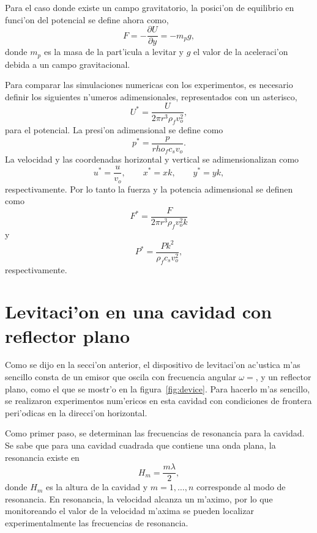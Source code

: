Para el caso donde existe un campo gravitatorio, la posici'on de equilibrio en funci'on del potencial
se define ahora como,
\begin{equation}
F = -\frac{\partial U}{\partial y} = -m_p g,
\end{equation}
donde $m_p$ es la masa de la part'icula a levitar y $g$ el valor de la aceleraci'on debida a un campo gravitacional.

Para comparar las simulaciones numericas con los experimentos, es necesario definir los siguientes n'umeros
adimensionales, representados con un asterisco,
\begin{equation}
U^\ast = \frac{U}{2\pi r^3\rho_fv_o^2},
\end{equation}
para el potencial. La presi'on adimensional se define como
\begin{equation}
p^\ast = \frac{p}{rho_f c_s v_o}.
\end{equation}
La velocidad y las coordenadas horizontal y vertical se adimensionalizan como
\begin{equation}
u^\ast = \frac{u}{v_o},\qquad x^\ast = xk, \qquad y^\ast = yk,
\end{equation}
respectivamente. Por lo tanto la fuerza y la potencia adimensional se definen como
\begin{equation}
F^\ast = \frac{F}{2\pi r^3\rho_fv_o^2k}
\end{equation}
y
\begin{equation}
P^\ast  = \frac{Pk^2}{\rho_f c_s v_o^2},
\end{equation}
respectivamente.




\section{Levitaci'on en una cavidad con reflector plano}

Como se dijo en la secci'on anterior, el dispositivo de levitaci'on ac'ustica
m'as sencillo consta de un emisor que oscila con frecuencia angular $\omega=$,
y un reflector plano, como el que se mostr'o en la figura~\ref{fig:device}. Para
hacerlo m'as sencillo, se realizaron experimentos num'ericos en esta cavidad
con condiciones de frontera peri'odicas en la direcci'on horizontal.

Como primer paso, se determinan las frecuencias de resonancia para la cavidad.
Se sabe que para una cavidad cuadrada que contiene una onda plana, la resonancia
existe en
\begin{equation}
H_m=\frac{m\lambda}{2},
\end{equation}
donde $H_m$ es la altura de la cavidad y $m=1,\ldots,n$ corresponde al modo
de resonancia. En resonancia, la velocidad alcanza un m'aximo, por lo que 
monitoreando el valor de la velocidad m'axima se pueden localizar
experimentalmente las frecuencias de resonancia.

